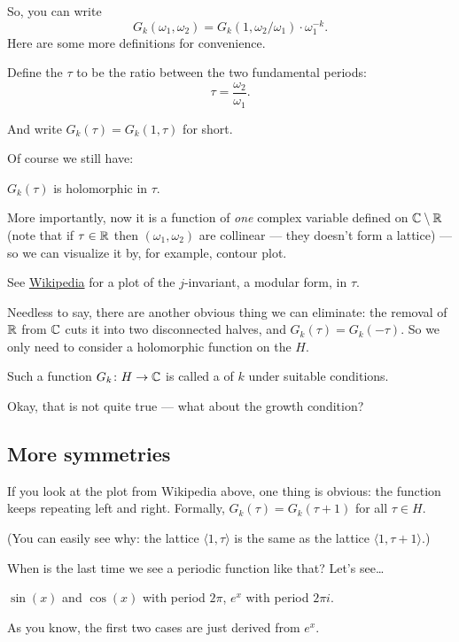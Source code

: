 So, you can write
\[ G_k(\omega_1, \omega_2) = G_k(1, \omega_2/\omega_1) \cdot \omega_1^{-k}. \]
Here are some more definitions for convenience.
\begin{definition}
	Define the  $\tau$ to be the ratio between the two fundamental periods:
	\[ \tau = \frac{\omega_2}{\omega_1}. \]
\end{definition}
And write $G_k(\tau) = G_k(1, \tau)$ for short.

Of course we still have:
\begin{claim}
	$G_k(\tau)$ is holomorphic in $\tau$.
\end{claim}

More importantly, now it is a function of \emph{one} complex variable defined on $\mathbb C \setminus \mathbb R$
(note that if $\tau \in \mathbb R$ then $(\omega_1, \omega_2)$ are collinear --- they doesn't form a
lattice) --- so we can visualize it by, for example, contour plot.

See \href{https://commons.wikimedia.org/wiki/File:KleinInvariantJ.jpg}{Wikipedia} for a plot of the
$j$-invariant, a modular form, in $\tau$.

Needless to say, there are another obvious thing we can eliminate:
the removal of $\mathbb R$ from $\mathbb C$ cuts it into two disconnected halves, and $G_k(\tau) =
G_k(-\tau)$. So we only need to consider a holomorphic function
on the  $H$.

\begin{definition}
	Such a function $G_k\colon H \to \mathbb C$ is called a  of  $k$
	under suitable conditions.
\end{definition}

Okay, that is not quite true --- what about the growth condition?

\subsection{More symmetries}

If you look at the plot from Wikipedia above, one thing is obvious:
the function keeps repeating left and right.
Formally, $G_k(\tau) = G_k(\tau+1)$ for all $\tau \in H$.

(You can easily see why:
the lattice $\langle 1, \tau \rangle$ is the same as the lattice $\langle 1, \tau+1 \rangle$.)

When is the last time we see a periodic function like that? Let's see\dots
\begin{itemize}
	\ii $\sin(x)$ and $\cos(x)$ with period $2 \pi$,
	\ii $e^x$ with period $2 \pi i$.
\end{itemize}
As you know, the first two cases are just derived from $e^x$.


